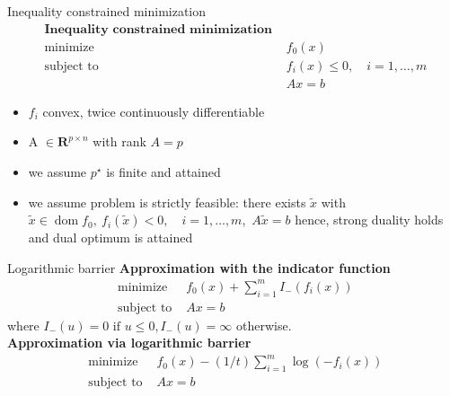 \documentclass{beamer}
\begin{document}
\begin{frame}[noframenumbering]{Inequality constrained minimization}
	\begin{equation*}
	\begin{array}{cl}{\textbf{ Inequality constrained minimization }} \\[0.4cm]  {\text { minimize }} & {f_{0}(x)} \\ {\text { subject to }} & {f_{i}(x) \leq 0, \quad i=1, \ldots, m} \\ {} & {A x=b}\end{array}
	\end{equation*}
	\begin{itemize}
		\item $f_i$ convex, twice continuously differentiable \\
		 \item A $ \in \mathbf{R}^{p \times n} $ with rank $ A = p$ \\
		 \item we assume  $ p^{\star} $  is finite and attained \\
		 \item  we assume problem is strictly feasible: there exists $ \tilde{x}$ with $ \tilde{x} \in \operatorname{dom} f_{0},\ f_{i}  (\tilde{x})<0, \quad i=1, \ldots, m$,\ $A\tilde{x}=b$
		  hence, strong duality holds and dual optimum is attained
	\end{itemize}
\end{frame}


\begin{frame}[noframenumbering]{Logarithmic barrier}
	\textbf{Approximation with the indicator function}
	\begin{equation*}
	\begin{array}{ll}{\text { minimize }} & {f_{0}(x)+\sum_{i=1}^{m} I_{-}\left(f_{i}(x)\right)} \\ {\text { subject to }} & {A x=b}\end{array}
	\end{equation*}
where
	$I_{-}(u)=0 \text { if } u \leq 0, I_{-}(u)=\infty
	$ otherwise.\\ [0.4cm]
	\textbf{Approximation via logarithmic barrier}
	\begin{equation*}
	\begin{array}{ll}{\text { minimize }} & {f_{0}(x)-(1 / t) \sum_{i=1}^{m} \log \left(-f_{i}(x)\right)} \\ {\text { subject to }} & {A x=b}\end{array}
	\end{equation*}
\end{frame}
\end{document}
